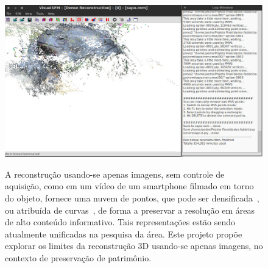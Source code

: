 \begin{figure} [!h]
	\centering
	\includegraphics[width=1\linewidth]{figs/rec3d.jpg}
	\label{fig:rec3d}
	\caption{A reconstrução usando-se apenas imagens, sem controle de aquisição, 
	   como em um vídeo de um smartphone filmado em torno do objeto, fornece uma
	   nuvem de pontos, que pode ser
	   densificada~\cite{Noah:Bundler,Noah:Steven:Bundler,Changchang:VisualSFM,Furukawa:Ponce:CVPR2007,Goesele:MVE:2014}, ou
	   atribuída de
	   curvas~\cite{Usumezbas:Fabbri:Kimia:ECCV16,Fabbri:Kimia:IJCV2016,Fabbri:Kimia:CVPR10,Fabbri:Giblin:Kimia:ECCV12}, de forma a preservar a resolução
	   em áreas de alto conteúdo informativo. Tais representações estão sendo
	   atualmente unificadas na pesquisa da área. Este projeto propõe explorar os
	   limites da reconstrução 3D usando-se apenas imagens, no contexto de
	   preservação de patrimônio.}
\end{figure}

